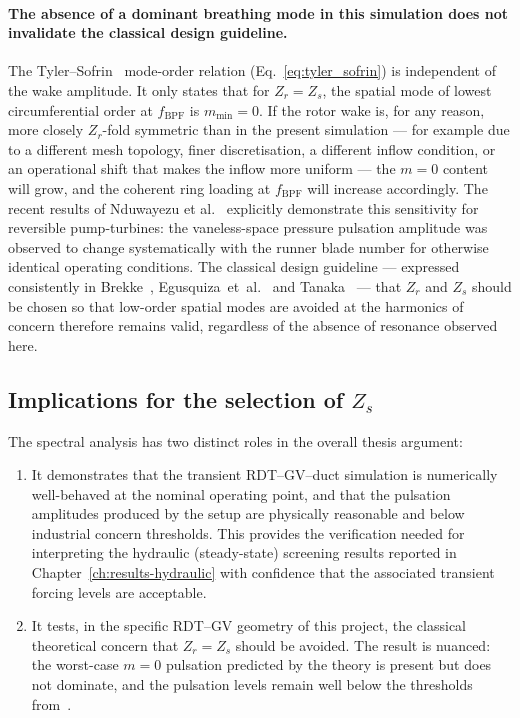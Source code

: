 \paragraph{The absence of a dominant breathing mode in this
simulation does not invalidate the classical design guideline.}
The Tyler--Sofrin~\cite{Tyler1962} mode-order relation
(Eq.~\eqref{eq:tyler_sofrin}) is independent of the wake amplitude.
It only states that for $Z_r = Z_s$, the spatial mode of lowest
circumferential order at $f_{\mathrm{BPF}}$ is $m_{\min} = 0$. If
the rotor wake is, for any reason, more closely $Z_r$-fold
symmetric than in the present simulation --- for example due to a
different mesh topology, finer discretisation, a different inflow
condition, or an operational shift that makes the inflow more
uniform --- the $m=0$ content will grow, and the coherent ring
loading at $f_{\mathrm{BPF}}$ will increase accordingly. The recent
results of Nduwayezu et al.~\cite{Nduwayezu2021} explicitly
demonstrate this sensitivity for reversible pump-turbines: the
vaneless-space pressure pulsation amplitude was observed to change
systematically with the runner blade number for otherwise identical
operating conditions. The classical design guideline --- expressed
consistently in Brekke~\cite{Brekke2015,Brekke2010},
Egusquiza~et~al.~\cite{Egusquiza2006} and
Tanaka~\cite{Tanaka2011} --- that $Z_r$ and $Z_s$ should be chosen
so that low-order spatial modes are avoided at the harmonics of
concern therefore remains valid, regardless of the absence of
resonance observed here.
 
\subsection{Implications for the selection of $Z_s$}
\label{sec:results-fft-implications}
 
The spectral analysis has two distinct roles in the overall thesis
argument:
\begin{enumerate}
  \item It demonstrates that the transient RDT--GV--duct
        simulation is numerically well-behaved at the nominal
        operating point, and that the pulsation amplitudes produced
        by the setup are physically reasonable and below industrial
        concern thresholds. This provides the verification needed
        for interpreting the hydraulic (steady-state) screening
        results reported in Chapter~\ref{ch:results-hydraulic} with
        confidence that the associated transient forcing levels are
        acceptable.
  \item It tests, in the specific RDT--GV geometry of this
        project, the classical theoretical concern that
        $Z_r = Z_s$ should be avoided. The result is nuanced: the
        worst-case $m=0$ pulsation predicted by the theory is
        present but does not dominate, and the pulsation levels
        remain well below the thresholds
        from~\cite{Brekke2015,Brekke2010}.
\end{enumerate}
 
